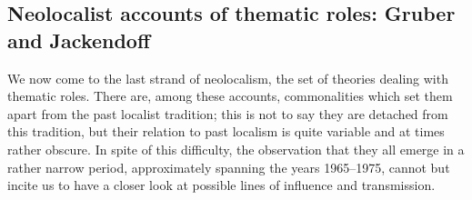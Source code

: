 \documentclass[english,output=paper,colorlinks,citecolor=brown]{../langscibook}
\begin{document}
\subsection{Neolocalist accounts of thematic roles: Gruber and Jackendoff}

We now come to the last strand of neolocalism, the set of theories dealing with thematic roles. There are, among these accounts, commonalities which set them apart from the past localist tradition; this is not to say they are detached from this tradition, but their relation to past localism is quite variable and at times rather obscure. In spite of this difficulty, the observation that they all emerge in a rather narrow period, approximately spanning the years 1965--1975, cannot but incite us to have a closer look at possible lines of influence and transmission.
\end{document}
